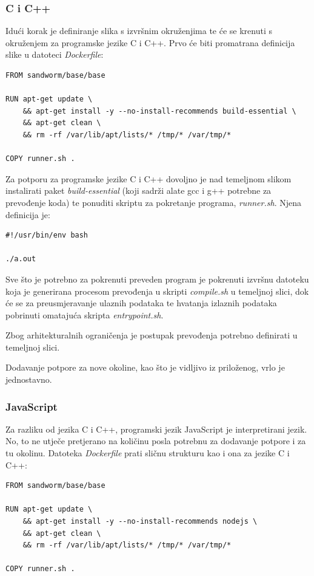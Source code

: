 \documentclass[times, utf8, zavrsni]{fer}
\begin{document}
\subsubsection{C i C++}

Idući korak je definiranje slika s izvršnim okruženjima te će se krenuti s okruženjem za programske jezike C i C++. Prvo će biti promatrana definicija slike u datoteci {\textit{Dockerfile}}:

\begin{lstlisting}
FROM sandworm/base/base

RUN apt-get update \
    && apt-get install -y --no-install-recommends build-essential \
    && apt-get clean \
    && rm -rf /var/lib/apt/lists/* /tmp/* /var/tmp/*

COPY runner.sh .
\end{lstlisting}

Za potporu za programske jezike C i C++ dovoljno je nad temeljnom slikom instalirati paket {\textit{build-essential}} (koji sadrži alate gcc i g++ potrebne za prevođenje koda) te ponuditi skriptu za pokretanje programa, {\textit{runner.sh}}. Njena definicija je:

\begin{lstlisting}
#!/usr/bin/env bash

./a.out
\end{lstlisting}

Sve što je potrebno za pokrenuti preveden program je pokrenuti izvršnu datoteku koja je generirana procesom prevođenja u skripti {\textit{compile.sh}} u temeljnoj slici, dok će se za preusmjeravanje ulaznih podataka te hvatanja izlaznih podataka pobrinuti omatajuća skripta {\textit{entrypoint.sh}}.

Zbog arhitekturalnih ograničenja je postupak prevođenja potrebno definirati u temeljnoj slici. 

Dodavanje potpore za nove okoline, kao što je vidljivo iz priloženog, vrlo je jednostavno.

\subsubsection{JavaScript}

Za razliku od jezika C i C++, programski jezik JavaScript je interpretirani jezik. No, to ne utječe pretjerano na količinu posla potrebnu za dodavanje potpore i za tu okolinu. Datoteka {\textit{Dockerfile}} prati sličnu strukturu kao i ona za jezike C i C++:

\begin{lstlisting}
FROM sandworm/base/base

RUN apt-get update \
    && apt-get install -y --no-install-recommends nodejs \
    && apt-get clean \
    && rm -rf /var/lib/apt/lists/* /tmp/* /var/tmp/*

COPY runner.sh .
\end{lstlisting}
\end{document}
